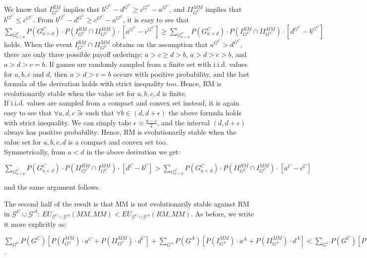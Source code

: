 \documentclass[fleqn,reqno,11pt]{article}
\begin{document}
\noindent We know that $I_{G^{C}}^{RM}$ implies that $b^{G^{C}}-d^{G^{C}}\geq c^{G^{C}}-a^{G^{C}}$,
and $II_{G^{C}}^{MM}$ implies that $b^{G^{C}}\leq c^{G^{C}}$. From
$b^{G^{C}}-d^{G^{C}}\geq c^{G^{C}}-a^{G^{C}}$, it is easy to see
that $\sum_{G_{a>d}^{C}}P(G_{a>d}^{C})\cdot P(I_{G^{C}}^{RM}\cap II_{G^{C}}^{MM})\cdot[a^{G^{C}}-c^{G^{C}}]\geq\sum_{G_{a>d}^{C}}P(G_{a>d}^{C})\cdot P(I_{G^{C}}^{RM}\cap II_{G^{C}}^{MM})\cdot[d^{G^{C}}-b^{G^{C}}]$
holds. When the event $I_{G^{C}}^{RM}\cap II_{G^{C}}^{MM}$ obtains
on the assumption that $a^{G^{C}}>d^{G^{C}}$, there are only three
possible payoff orderings: $a>c\geq d>b$, $a>d>c>b$, and $a>d>c=b$.
If games are randomly sampled from a finite set with i.i.d. values
for $a,b,c$ and $d$, then $a>d>c=b$ occurs with positive probability,
and the last formula of the derivation holds with strict inequality
too. Hence, RM is evolutionarily stable when the value set for $a,b,c,d$
is finite. \\
If i.i.d. values are sampled from a compact and convex set instead,
it is again easy to see that $\forall a,d,c\ \exists\epsilon$ such
that $\forall b\in(d,d+\epsilon)$ the above formula holds with strict
inequality. We can simply take $\epsilon\equiv\frac{a-c}{2}$, and
the interval $(d,d+\epsilon)$ always has positive probability. Hence,
RM is evolutionarily stable when the value set for $a,b,c,d$ is a
compact and convex set too. \\
Symmetrically, from $a<d$ in the above derivation we get:

\medskip{}

\noindent $\sum_{G_{a<d}^{C}}P(G_{a<d}^{C})\cdot P(II_{G^{C}}^{RM}\cap I_{G^{C}}^{MM})\cdot[d^{C}-b^{C}]>\sum_{G_{a<d}^{C}}P(G_{a<d}^{C})\cdot P(II_{G^{C}}^{RM}\cap I_{G^{C}}^{MM})\cdot[a^{C}-c^{C}]$

\medskip{}

\noindent and the same argument follows.

\medskip{}

The second half of the result is that MM is not evolutionarily stable
against RM in $\mathcal{G}^{C}\cup\mathcal{G^{A}}$: $EU_{\mathcal{G}^{C}\cup\mathcal{G^{A}}}(MM,MM)<EU_{\mathcal{G}^{C}\cup\mathcal{G^{A}}}(RM,MM)$.
As before, we write it more explicitly as:

\medskip{}


\noindent $\sum_{G^{C}}P(G^{C})[P(I_{G^{C}}^{MM})\cdot a^{C}+P(II_{G^{C}}^{MM})\cdot d^{C}]+\sum_{G^{A}}P(G^{A})[P(I_{G^{A}}^{MM})\cdot a^{A}+P(II_{G^{A}}^{MM})\cdot d^{A}]<\sum_{G^{C}}P(G^{C})[P(I_{G^{C}}^{MM}\cap I_{G^{C}}^{RM})\cdot a^{C}+P(II_{G^{C}}^{MM}\cap II_{G^{C}}^{RM})\cdot d^{C}+P(I_{G^{C}}^{MM}\cap II_{G^{C}}^{RM})\cdot c^{C}+P(II_{G^{C}}^{MM}\cap I_{G^{C}}^{RM})\cdot b^{C}]+\sum_{G^{A}}P(G^{A})[P(I_{G^{A}}^{MM}\cap I_{G^{A}}^{RM})\cdot a^{A}+P(II_{G^{A}}^{MM}\cap II_{G^{A}}^{RM})\cdot d^{A}+P(I_{G^{A}}^{MM}\cap II_{G^{A}}^{RM})\cdot c^{A}+P(II_{G^{A}}^{MM}\cap I_{G^{A}}^{RM})\cdot b^{A}]$.
\medskip{}
\end{document}
